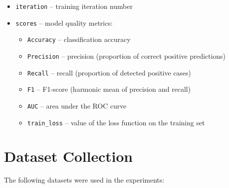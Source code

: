 \documentclass[a4paper,12pt]{article}
\begin{document}
\begin{itemize}
  \item \texttt{iteration} -- training iteration number

  \item \texttt{scores} -- model quality metrics:
    \begin{itemize}
      \item \texttt{Accuracy} -- classification accuracy
      \item \texttt{Precision} -- precision (proportion of correct positive predictions)
      \item \texttt{Recall} -- recall (proportion of detected positive cases)
      \item \texttt{F1} -- F1-score (harmonic mean of precision and recall)
      \item \texttt{AUC} -- area under the ROC curve
      \item \texttt{train\_loss} -- value of the loss function on the training set
    \end{itemize}
\end{itemize}

\newpage

\section{Dataset Collection}
The following datasets were used in the experiments:
\end{document}
